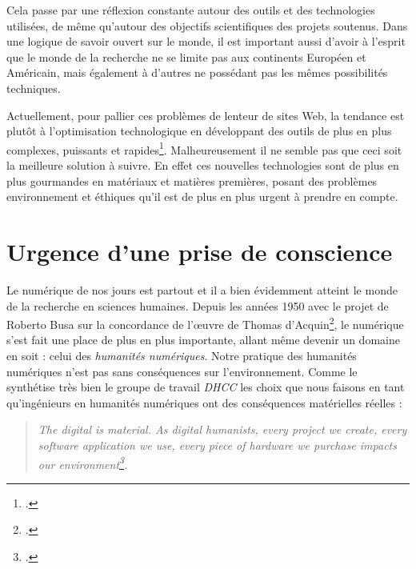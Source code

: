 \documentclass[a4paper,12pt,twoside]{book}
\begin{document}
Cela passe par une réflexion constante autour des outils et des technologies utilisées, de même qu'autour des objectifs scientifiques des projets soutenus. Dans une logique de savoir ouvert sur le monde, il est important aussi d'avoir à l'esprit que le monde de la recherche ne se limite pas aux continents Européen et Américain, mais également à d'autres ne possédant pas les mêmes possibilités techniques.

Actuellement, pour pallier ces problèmes de lenteur de sites Web, la tendance est plutôt à l'optimisation technologique en développant des outils de plus en plus complexes, puissants et rapides\footcite{sixg}. Malheureusement il ne semble pas que ceci soit la meilleure solution à suivre. En effet ces nouvelles technologies sont de plus en plus gourmandes en matériaux et matières premières, posant des problèmes environnement et éthiques qu'il est de plus en plus urgent à prendre en compte.


\section{Urgence d'une prise de conscience}
Le numérique de nos jours est partout et il a bien évidemment atteint le monde de la recherche en sciences humaines. Depuis les années 1950 avec le projet de Roberto Busa sur la concordance de l'\oe{}uvre de Thomas d'Acquin\footcite{kinsella_review_1997}, le numérique s'est fait une place de plus en plus importante, allant même devenir un domaine en soit : celui des \textit{humanités numériques}.
Notre pratique des humanités numériques n'est pas sans conséquences sur l'environnement. Comme le synthétise très bien le groupe de travail \textit{\acrfull{DHCC}} les choix que nous faisons en tant qu'ingénieurs en humanités numériques ont des conséquences matérielles réelles :

\begin{otherlanguage}{english}
\begin{quote}
    \textit{The digital is material. As digital humanists, every project we create, every software application we use, every piece of hardware we purchase impacts our environment\footcite{DHCC}.}
\end{quote}
\end{otherlanguage}
\end{document}
